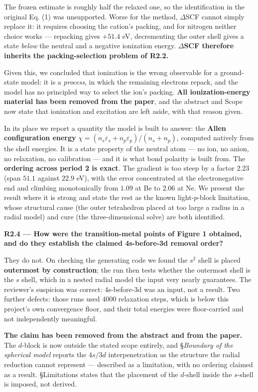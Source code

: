 \documentclass[11pt,a4paper]{article}
\begin{document}
The frozen estimate is roughly half the relaxed one, so the identification in the original
Eq. (1) was unsupported. Worse for the method, $\Delta$SCF cannot simply replace it: it
requires choosing the cation's packing, and for nitrogen neither choice works --- repacking gives
$+51.4$ eV, decrementing the outer shell gives a state \emph{below} the neutral and a negative
ionization energy. \textbf{$\Delta$SCF therefore inherits the packing-selection problem of R2.2.}

Given this, we concluded that ionization is the wrong observable for a ground-state model:
it is a \emph{process}, in which the remaining electrons repack, and the model has no principled way
to select the ion's packing. \textbf{All ionization-energy material has been removed from the
paper}, and the abstract and Scope now state that ionization and excitation are left aside,
with that reason given.

In its place we report a quantity the model is built to answer: the \textbf{Allen configuration
energy} $\chi = (n_s\varepsilon_s + n_p\varepsilon_p)/(n_s+n_p)$, computed natively from the
shell energies. It is a state property of the neutral atom --- no ion, no anion, no relaxation,
no calibration --- and it is what bond polarity is built from. The \textbf{ordering across period 2 is
exact}. The gradient is too steep by a factor $2.23$ (span $51.1$ against $22.9$ eV), with the
error concentrated at the electronegative end and climbing monotonically from $1.09$ at Be to
$2.06$ at Ne. We present the result where it is strong and state the rest as the known
light-$p$-block limitation, whose structural cause (the outer tetrahedron placed at too large a
radius in a radial model) and cure (the three-dimensional solve) are both identified.

\textbf{R2.4 --- How were the transition-metal points of Figure 1 obtained, and do they establish the
claimed 4s-before-3d removal order?}

They do not. On checking the generating code we found the $s^2$ shell is placed \textbf{outermost by
construction}; the run then tests whether the outermost shell is the $s$ shell, which in a
nested radial model the input very nearly guarantees. The reviewer's suspicion was correct:
4s-before-3d was an input, not a result. Two further defects: those runs used 4000 relaxation
steps, which is below this project's own convergence floor, and their total energies were
floor-carried and not independently meaningful.

\textbf{The claim has been removed from the abstract and from the paper.} The $d$-block is now
outside the stated scope entirely, and §\emph{Boundary of the spherical model} reports the $4s/3d$
interpenetration as the structure the radial reduction cannot represent --- described as a
limitation, with no ordering claimed as a result. §Limitations states that the placement of the
$d$-shell inside the $s$-shell is imposed, not derived.
\end{document}
